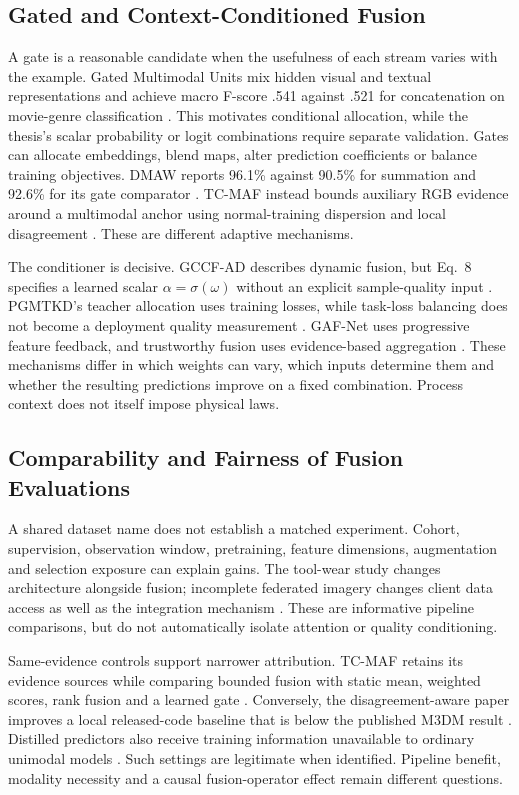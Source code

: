 \subsection{Gated and Context-Conditioned Fusion}
A gate is a reasonable candidate when the usefulness of each stream varies with the example. Gated Multimodal Units mix hidden visual and textual representations and achieve macro F-score .541 against .521 for concatenation on movie-genre classification \citep[Section~3, Table~2]{P006}. This motivates conditional allocation, while the thesis's scalar probability or logit combinations require separate validation. Gates can allocate embeddings, blend maps, alter prediction coefficients or balance training objectives. DMAW reports 96.1\% against 90.5\% for summation and 92.6\% for its gate comparator \citep[PDF p.~9, Table~V]{P003}. TC-MAF instead bounds auxiliary RGB evidence around a multimodal anchor using normal-training dispersion and local disagreement \citep[PDF pp.~3--5]{P026}. These are different adaptive mechanisms.

The conditioner is decisive. GCCF-AD describes dynamic fusion, but Eq.~8 specifies a learned scalar $\alpha=\sigma(\omega)$ without an explicit sample-quality input \citep[PDF p.~3]{P038}. PGMTKD's teacher allocation uses training losses, while task-loss balancing does not become a deployment quality measurement \citep{Li2025PGMTKD,P045}. GAF-Net uses progressive feature feedback, and trustworthy fusion uses evidence-based aggregation \citep{Huang2026Rolling,Ying2025Trustworthy}. These mechanisms differ in which weights can vary, which inputs determine them and whether the resulting predictions improve on a fixed combination. Process context does not itself impose physical laws.

\subsection{Comparability and Fairness of Fusion Evaluations}
A shared dataset name does not establish a matched experiment. Cohort, supervision, observation window, pretraining, feature dimensions, augmentation and selection exposure can explain gains. The tool-wear study changes architecture alongside fusion; incomplete federated imagery changes client data access as well as the integration mechanism \citep{P045,P051}. These are informative pipeline comparisons, but do not automatically isolate attention or quality conditioning.

Same-evidence controls support narrower attribution. TC-MAF retains its evidence sources while comparing bounded fusion with static mean, weighted scores, rank fusion and a learned gate \citep[PDF p.~7, Table~3]{P026}. Conversely, the disagreement-aware paper improves a local released-code baseline that is below the published M3DM result \citep[PDF p.~10, Table~4]{P033}. Distilled predictors also receive training information unavailable to ordinary unimodal models \citep{Li2025PGMTKD}. Such settings are legitimate when identified. Pipeline benefit, modality necessity and a causal fusion-operator effect remain different questions.


